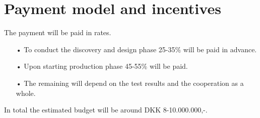 \section{Payment model and incentives}
The payment will be paid in rates. 
\begin{enumerate}
\item[•] To conduct the discovery and design phase 25-35\% will be paid in advance. 
\item[•] Upon starting production phase 45-55\% will be paid. 
\item[•] The remaining will depend on the test results and the cooperation as a whole.
\end{enumerate}

In total the estimated budget will be around DKK 8-10.000.000,-. 